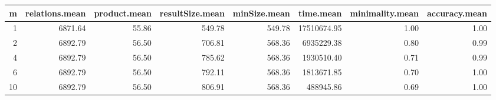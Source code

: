 \begin{table}[ht]
\centering
\begin{tabular}{rrrrrrrr}
  \hline
m & relations.mean & product.mean & resultSize.mean & minSize.mean & time.mean & minimality.mean & accuracy.mean \\ 
  \hline
  1 & 6871.64 & 55.86 & 549.78 & 549.78 & 17510674.95 & 1.00 & 1.00 \\ 
    2 & 6892.79 & 56.50 & 706.81 & 568.36 & 6935229.38 & 0.80 & 0.99 \\ 
    4 & 6892.79 & 56.50 & 785.62 & 568.36 & 1930510.40 & 0.71 & 0.99 \\ 
    6 & 6892.79 & 56.50 & 792.11 & 568.36 & 1813671.85 & 0.70 & 1.00 \\ 
   10 & 6892.79 & 56.50 & 806.91 & 568.36 & 488945.86 & 0.69 & 1.00 \\ 
   \hline
\end{tabular}
\end{table}
